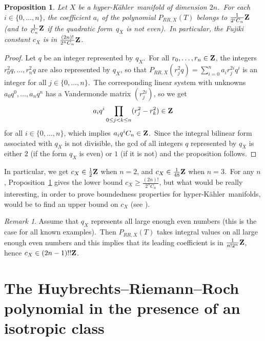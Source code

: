 \documentclass[12pt]{amsart}
\def\Z{{\bf Z}}
\def\hk{hyper-K\"ahler}
\newtheorem{prop}[lemm]{Proposition}
\theoremstyle{remark}
\newtheorem{rema}[lemm]{Remark}
\begin{document}
\begin{prop}\label{prop12}
Let $X$ be a \hk\ manifold of dimension $2n$.\  
For each $i\in\{0,\dots,n\}$, the coefficient $a_i$ of the polynomial $P_{RR,X}(T)$ belongs to $\frac{1}{2^iC_n}\Z$ (and to $\frac{1}{C_n}\Z$ if the quadratic form~$q_X$ is not even).\ 
In particular, the Fujiki constant $c_X$ is in $ \frac{(2n)!}{2^nC_n}\Z$.
\end{prop}

\begin{proof}
Let $q $ be an integer represented by $q_X$.\ 
For all $r_0,\dots,r_n\in \Z$, the integers $r_0^2q,\dots,r_n^2q$ are also represented by $q_X$, so that $P_{RR,X}(r_j^2q)=\sum_{i=0}^n  a_i r_j^{2i}q^i$ is an integer for all $j\in\{0,\dots,n\}$.\ 
The corresponding linear system with unknowns $a_0q^0,\dots,a_nq^n$ has a   Vandermonde matrix $(r_j^{2i})$, so we get
\[
a_iq^i\prod_{0\le j<k\le n}( r_j^2- r_k^2)   \in\Z
\]
for all $i\in\{0,\dots,n\}$, which implies $a_iq^iC_n\in\Z$.\ 
Since the  integral bilinear form associated with $q_X$ is  not  divisible, the gcd of all integers $q$ represented by $q_X$ is either $2$ (if the form $q_X$ is even) or $1$ (if it is not) and the proposition follows.
\end{proof}

In particular, we get $c_X\in\frac12\Z$ when $n=2$, and $c_X\in\frac1{48}\Z$ when $n=3$.\ For any $n$, Proposition~\ref{prop12} gives the lower bound $c_X\ge \frac{(2n)!}{2^nC_n}$, but what would be really interesting, in order to prove boundedness properties for \hk\ manifolds, would be to find  an upper bound on $c_X$ (see \cite{huyf}).

\begin{rema}\label{rem12}
Assume that $q_X$ represents all large enough even numbers (this is the case for all known examples).\ 
Then $P_{RR,X}(T)$ takes integral values on all large enough even numbers and this implies that its leading coefficient is in $\frac1{n!2^n}\Z$, hence $c_X\in (2n-1)!!\Z$.
\end{rema}


 

 




 




 \section{The Huybrechts--Riemann--Roch polynomial in the presence of an isotropic class}
 
\end{document}
